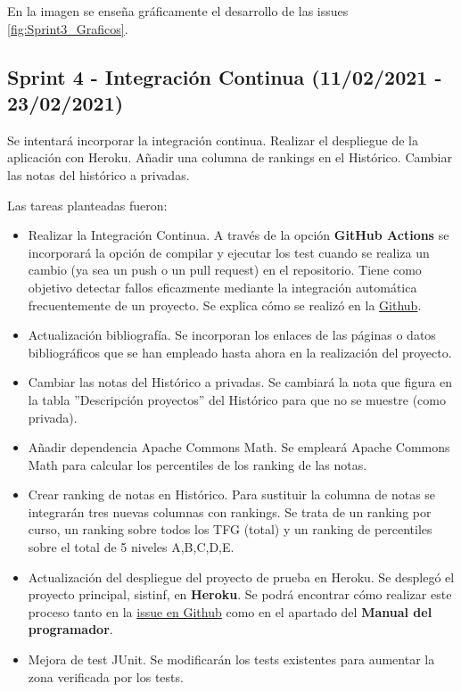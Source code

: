 En la imagen se enseña gráficamente el desarrollo de las issues \ref{fig:Sprint3_Graficos}.


\subsection{Sprint 4 - Integración Continua (11/02/2021 - 23/02/2021)}
Se intentará incorporar la integración continua. Realizar el despliegue de la aplicación con Heroku. Añadir una columna de rankings en el Histórico. Cambiar las notas del histórico a privadas.

Las tareas planteadas fueron:
\begin{itemize}
	\tightlist
	\item Realizar la Integración Continua.
		A través de la opción \textbf{GitHub Actions} se incorporará la opción de compilar y ejecutar los test cuando se realiza un cambio (ya sea un push o un pull request) en el repositorio. Tiene como objetivo detectar fallos eficazmente mediante la integración automática frecuentemente de un proyecto. Se explica cómo se realizó en la \href{https://github.com/dbo1001/Gestor-TFG-2021/issues/37}{Github}.
	\item Actualización bibliografía. 
		Se incorporan los enlaces de las páginas o datos bibliográficos que se han empleado hasta ahora en la realización del proyecto.
	\item Cambiar las notas del Histórico a privadas. 
		Se cambiará la nota que figura en la tabla ''Descripción proyectos'' del Histórico para que no se muestre (como privada).
	\item Añadir dependencia Apache Commons Math. 
		Se empleará Apache Commons Math para calcular los percentiles de los ranking de las notas.
	\item Crear ranking de notas en Histórico. 
		Para sustituir la columna de notas se integrarán tres nuevas columnas con rankings. Se trata de un ranking por curso, un ranking sobre todos los TFG (total) y un ranking de percentiles sobre el total de 5 niveles A,B,C,D,E.
	\item Actualización del despliegue del proyecto de prueba en Heroku. 
		Se desplegó el proyecto principal, sistinf, en \textbf{Heroku}. Se podrá encontrar cómo realizar este proceso tanto en la \href{https://github.com/dbo1001/Gestor-TFG-2021/issues/36}{issue en Github} como en el apartado del \textbf{Manual del programador}.
	\item Mejora de test JUnit. 
		Se modificarán los tests existentes para aumentar la zona verificada por los tests.
	
\end{itemize}

